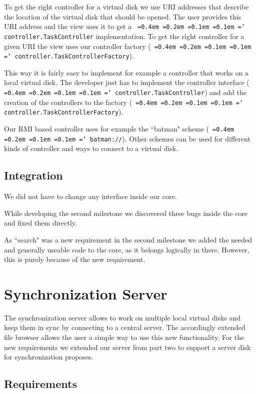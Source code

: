 \documentclass[a4paper,12pt]{article}
\newcommand*\justify{%
  \fontdimen2\font=0.4em%
  \fontdimen3\font=0.2em%
  \fontdimen4\font=0.1em%
  \fontdimen7\font=0.1em%
  \hyphenchar\font=`\-%
}
\newcommand{\mono}[1]{\texttt{\justify #1}}
\begin{document}
To get the right controller for a virtual disk we use URI addresses that describe the location of the virtual disk that should be opened. The user provides this URI address and the view uses it to get a \mono{controller.TaskController} implementation. To get the right controller for a given URI the view uses our controller factory (\mono{controller.TaskControllerFactory}).

This way it is fairly easy to implement for example a controller that works on a local virtual disk. The developer just has to implement the controller interface (\mono{controller.TaskController}) and add the creation of the controllers to the factory (\mono{controller.TaskControllerFactory}).

Our RMI based controller uses for example the ``batman" scheme (\mono{batman://}). Other schemes can be used for different kinds of controller and ways to connect to a virtual disk.

\subsection{Integration}
We did not have to change any interface inside our core.

While developing the second milestone we discovered three bugs inside the core and fixed them directly.

As ``search" was a new requirement in the second milestone we added the needed and generally useable code to the core, as it belongs logically in there. However, this is purely because of the new requirement.




\section{Synchronization Server}

The synchronization server allows to work on multiple local virtual disks and keep them in sync by connecting to a central server. The accordingly extended file browser allows the user a simple way to use this new functionality. For the new requirements we extended our server from part two to support a server disk for synchronization proposes.

\subsection{Requirements}
\end{document}
